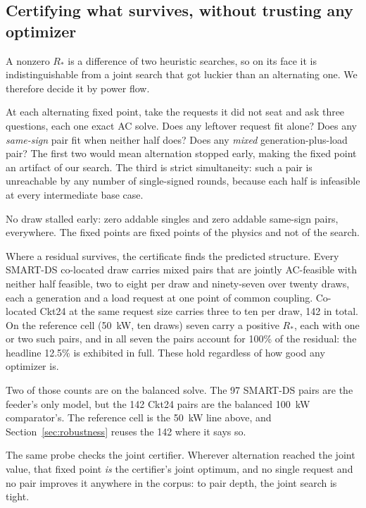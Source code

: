 \documentclass[review,authoryear,12pt]{elsarticle}
\begin{document}
\subsection{Certifying what survives, without trusting any optimizer}
\label{sec:certificate}

A nonzero $R_{\ast}$ is a difference of two heuristic searches, so on its face
it is indistinguishable from a joint search that got luckier than an
alternating one. We therefore decide it by power flow.

At each alternating fixed point, take the requests it did not seat and ask
three questions, each one exact AC solve. Does any leftover request fit alone?
Does any \emph{same-sign} pair fit when neither half does? Does any \emph{mixed}
generation-plus-load pair? The first two would mean alternation stopped early,
making the fixed point an artifact of our search. The third is strict
simultaneity: such a pair is unreachable by any number of single-signed rounds,
because each half is infeasible at every intermediate base case.

No draw stalled early: zero addable singles and zero addable same-sign pairs,
everywhere. The fixed points are fixed points of the physics and not of the
search.

Where a residual survives, the certificate finds the predicted structure. Every
SMART-DS co-located draw carries mixed pairs that are jointly AC-feasible with
neither half feasible, two to eight per draw and ninety-seven over twenty draws,
each a generation and a load request at one point of common coupling. Co-located
Ckt24 at the same request size carries three to ten per draw, 142 in total.
On the reference cell (50~kW, ten draws) seven carry a positive
$R_{\ast}$, each with one or two such pairs, and in all seven the pairs account
for 100\% of the residual: the headline 12.5\% is exhibited in full. These hold
regardless of how good any optimizer is.

Two of those counts are on the balanced solve. The 97 SMART-DS pairs are the
feeder's only model, but the 142 Ckt24 pairs are the balanced 100~kW
comparator's. The reference cell is the 50~kW line above, and
Section~\ref{sec:robustness} reuses the 142 where it says so.

The same probe checks the joint certifier. Wherever alternation reached the
joint value, that fixed point \emph{is} the certifier's joint optimum, and no
single request and no pair improves it anywhere in the corpus: to pair depth,
the joint search is tight.
\end{document}
